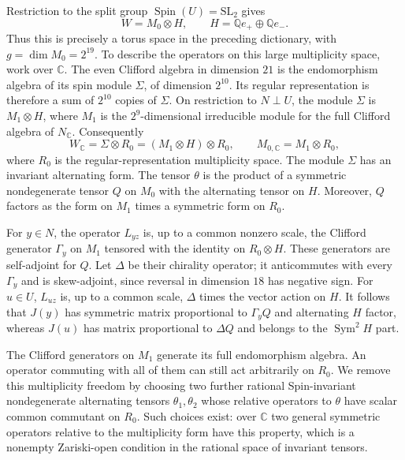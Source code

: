 \documentclass[11pt]{article}
\numberwithin{equation}{section}
\theoremstyle{definition}
\theoremstyle{remark}
\newcommand{\Q}{\mathbb Q}
\newcommand{\C}{\mathbb C}
\DeclareMathOperator{\Spin}{Spin}
\begin{document}
Restriction to the split group $\Spin(U)=\mathrm{SL}_2$ gives
\[
 W=M_0\otimes H,
 \qquad H=\Q e_+\oplus\Q e_-.
\]
Thus this is precisely a torus space in the preceding dictionary,
with $g=\dim M_0=2^{19}$.  To describe the operators on this large
multiplicity space, work over $\C$.  The even Clifford algebra in
dimension $21$ is the endomorphism algebra of its spin module
$\Sigma$, of dimension $2^{10}$.  Its regular representation is
therefore a sum of $2^{10}$ copies of $\Sigma$.  On restriction to
$N\perp U$, the module $\Sigma$ is $M_1\otimes H$, where $M_1$
is the $2^9$-dimensional irreducible module for the full Clifford
algebra of $N_{\C}$.  Consequently
\begin{equation}
 \label{ks:multiplicity}
 W_{\C}=\Sigma\otimes R_0=(M_1\otimes H)\otimes R_0,
 \qquad M_{0,\C}=M_1\otimes R_0,
\end{equation}
where $R_0$ is the regular-representation multiplicity space.
The module $\Sigma$ has an invariant alternating form.  The tensor $\theta$ is the
product of a symmetric nondegenerate tensor $Q$ on $M_0$ with
the alternating tensor on $H$.  Moreover, $Q$ factors as the
form on $M_1$ times a symmetric form on $R_0$.

For $y\in N$, the operator $L_{yz}$ is, up to a common nonzero
scale, the Clifford generator $\Gamma_y$ on $M_1$ tensored with
the identity on $R_0\otimes H$.  These generators are
self-adjoint for $Q$.  Let $\Delta$ be their chirality operator;
it anticommutes with every $\Gamma_y$ and is skew-adjoint,
since reversal in dimension $18$ has negative sign.  For
$u\in U$, $L_{uz}$ is, up to a common scale, $\Delta$ times
the vector action on $H$.  It follows that $J(y)$ has symmetric
matrix proportional to $\Gamma_yQ$ and alternating $H$ factor,
whereas $J(u)$ has matrix proportional to $\Delta Q$ and
belongs to the $\operatorname{Sym}^2H$ part.

The Clifford generators on $M_1$ generate its full endomorphism
algebra.  An operator commuting with all of them can still act
arbitrarily on $R_0$.  We remove this multiplicity freedom by choosing
two further rational Spin-invariant nondegenerate
alternating tensors $\theta_1,\theta_2$ whose relative
operators to $\theta$ have scalar common commutant on $R_0$.
Such choices exist: over $\C$ two general symmetric operators
relative to the multiplicity form have this property, which is
a nonempty Zariski-open condition in the rational space of
invariant tensors.
\end{document}
